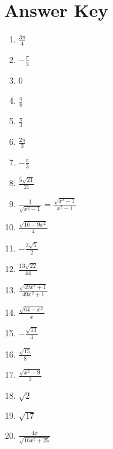 \section{Answer Key}

\begin{enumerate}
	\item $\frac{3\pi}{4}$
	\item $-\frac{\pi}{3}$
	\item 0
	\item $\frac{\pi}{6}$
	\item $\frac{\pi}{3}$
	\item $\frac{2\pi}{3}$
	\item $-\frac{\pi}{3}$
    \item $\frac{5\sqrt{21}}{21}$
    \item $\frac{1}{\sqrt{x^2-1}} = \frac{\sqrt{x^2-1}}{x^2-1}$
    \item $\frac{\sqrt{16-9x^2}}{4}$
    \item $-\frac{3\sqrt{5}}{2}$
    \item $\frac{13\sqrt{22}}{44}$
    \item $\frac{\sqrt{49x^2+1}}{49x^2+1}$
    \item $\frac{\sqrt{64-x^2}}{x}$
    \item $-\frac{\sqrt{13}}{3}$
    \item $\frac{\sqrt{15}}{8}$
    \item $\frac{\sqrt{x^2-9}}{3}$
    \item $\sqrt{2}$
    \item $\sqrt{17}$
    \item $\frac{4x}{\sqrt{16x^2+25}}$
\end{enumerate}
